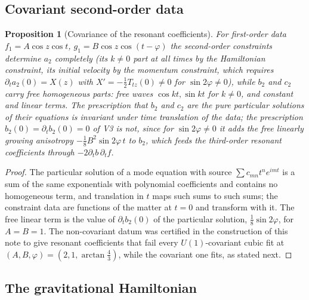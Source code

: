 \documentclass[11pt]{article}
\newtheorem{proposition}[theorem]{Proposition}
\theoremstyle{remark}
\begin{document}
\subsection{Covariant second-order data}

\begin{proposition}[Covariance of the resonant coefficients]
\label{prop:v20v8-covariance}
For first-order data \(f_1=A\cos z\cos t\), \(g_1=B\cos z\cos(t-\varphi)\)
the second-order constraints determine \(a_2\) completely (its
\(k\neq0\) part at all times by the Hamiltonian constraint, its
initial velocity by the momentum constraint, which requires
\(\partial_ta_2(0)=X(z)\) with \(X'=-\tfrac12T_{tz}(0)\neq0\) for
\(\sin2\varphi\neq0\)), while \(b_2\) and \(c_2\) carry free
homogeneous parts: free waves \(\cos kt,\sin kt\) for \(k\neq0\), and
constant and linear terms.  The prescription that \(b_2\) and \(c_2\)
are the pure particular solutions of their equations is invariant
under time translation of the data; the prescription
\(b_2(0)=\partial_tb_2(0)=0\) of V3 is not, since for
\(\sin2\varphi\neq0\) it adds the free linearly growing anisotropy
\(-\tfrac18B^2\sin2\varphi\,t\) to \(b_2\), which feeds the third-order
resonant coefficients through \(-2\partial_tb\,\partial_tf\).
\end{proposition}

\begin{proof}
The particular solution of a mode equation with source
\(\sum c_{mn}t^ne^{imt}\) is a sum of the same exponentials with
polynomial coefficients and contains no homogeneous term, and
translation in \(t\) maps such sums to such sums; the constraint data
are functions of the matter at \(t=0\) and transform with it.  The free
linear term is the value of \(\partial_tb_2(0)\) of the particular
solution, \(\tfrac18\sin2\varphi\), for \(A=B=1\).  The non-covariant
datum was certified in the construction of this note to give
resonant coefficients that fail every \(U(1)\)-covariant cubic fit
at \((A,B,\varphi)=(2,1,\arctan\tfrac43)\), while the covariant one
fits, as stated next.
\end{proof}

\subsection{The gravitational Hamiltonian}
\end{document}

